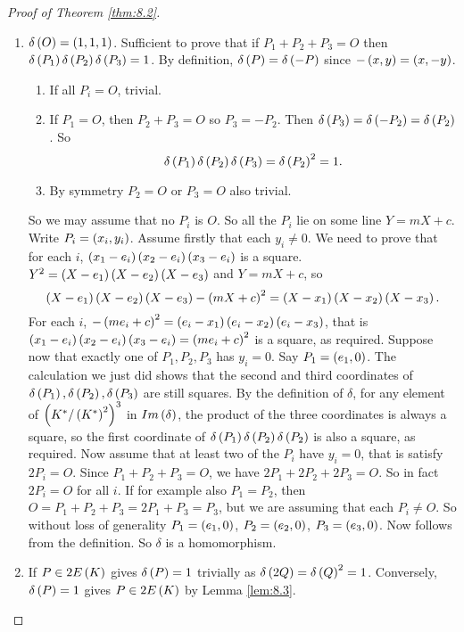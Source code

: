 \begin{proof}[Proof of Theorem \ref{thm:8.2}]
\hfill
\begin{enumerate}
\item $ \delta\br{O} = \br{1, 1, 1} $. Sufficient to prove that if $ P_1 + P_2 + P_3 = O $ then $ \delta\br{P_1}\delta\br{P_2}\delta\br{P_3} = 1 $. By definition, $ \delta\br{P} = \delta\br{-P} $ since $ -\br{x, y} = \br{x, -y} $.
\begin{enumerate}
\item If all $ P_i = O $, trivial.
\item If $ P_1 = O $, then $ P_2 + P_3 = O $ so $ P_3 = -P_2 $. Then $ \delta\br{P_3} = \delta\br{-P_2} = \delta\br{P_2} $. So
$$ \delta\br{P_1}\delta\br{P_2}\delta\br{P_3} = \delta\br{P_2}^2 = 1. $$
\item By symmetry $ P_2 = O $ or $ P_3 = O $ also trivial.
\end{enumerate}
So we may assume that no $ P_i $ is $ O $. So all the $ P_i $ lie on some line $ Y = mX + c $. Write $ P_i = \br{x_i, y_i} $. Assume firstly that each $ y_i \ne 0 $. We need to prove that for each $ i $, $ \br{x_1 - e_i}\br{x_2 - e_i}\br{x_3 - e_i} $ is a square. $ Y^2 = \br{X - e_1}\br{X - e_2}\br{X - e_3} $ and $ Y = mX + c $, so
$$ \br{X - e_1}\br{X - e_2}\br{X - e_3} - \br{mX + c}^2 = \br{X - x_1}\br{X - x_2}\br{X - x_3}. $$
For each $ i $, $ -\br{me_i + c}^2 = \br{e_i - x_1}\br{e_i - x_2}\br{e_i - x_3} $, that is $ \br{x_1 - e_i}\br{x_2 - e_i}\br{x_3 - e_i} = \br{me_i + c}^2 $ is a square, as required. Suppose now that exactly one of $ P_1, P_2, P_3 $ has $ y_i = 0 $. Say $ P_1 = \br{e_1, 0} $. The calculation we just did shows that the second and third coordinates of $ \delta\br{P_1}, \delta\br{P_2}, \delta\br{P_3} $ are still squares. By the definition of $ \delta $, for any element of $ \br{K^* / \br{K^*}^2}^3 $ in $ Im\br{\delta} $, the product of the three coordinates is always a square, so the first coordinate of $ \delta\br{P_1}\delta\br{P_2}\delta\br{P_2} $ is also a square, as required. Now assume that at least two of the $ P_i $ have $ y_i = 0 $, that is satisfy $ 2P_i = O $. Since $ P_1 + P_2 + P_3 = O $, we have $ 2P_1 + 2P_2 + 2P_3 = O $. So in fact $ 2P_i = O $ for all $ i $. If for example also $ P_1 = P_2 $, then $ O = P_1 + P_2 + P_3 = 2P_1 + P_3 = P_3 $, but we are assuming that each $ P_i \ne O $. So without loss of generality $ P_1 = \br{e_1, 0} $, $ P_2 = \br{e_2, 0} $, $ P_3 = \br{e_3, 0} $. Now follows from the definition. So $ \delta $ is a homomorphism.
\item If $ P \in 2E\br{K} $ gives $ \delta\br{P} = 1 $ trivially as $ \delta\br{2Q} = \delta\br{Q}^2 = 1 $. Conversely, $ \delta\br{P} = 1 $ gives $ P \in 2E\br{K} $ by Lemma \ref{lem:8.3}.
\end{enumerate}
\end{proof}

